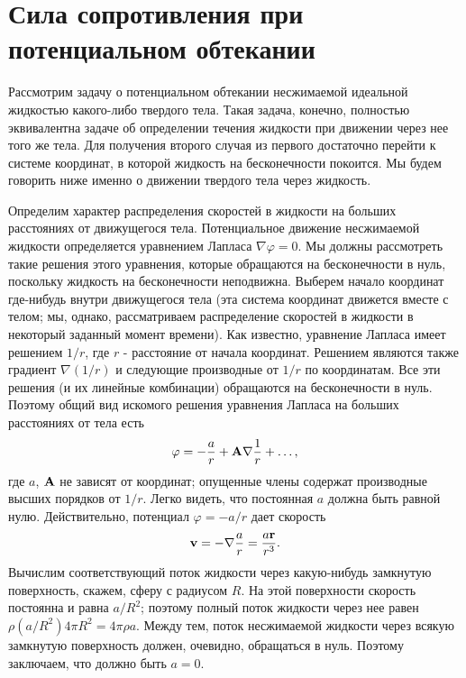 \section{Сила сопротивления при потенциальном обтекании}
\label{sec:p11}

Рассмотрим задачу о потенциальном обтекании несжимаемой идеальной жидкостью
какого-либо твердого тела. Такая задача, конечно, полностью эквивалентна задаче
об определении течения жидкости при движении через нее того же тела. Для
получения второго случая из первого достаточно перейти к системе координат, в
которой жидкость на бесконечности покоится. Мы будем говорить ниже именно о
движении твердого тела через жидкость.

Определим характер распределения скоростей в жидкости на больших расстояниях от
движущегося тела. Потенциальное движение несжимаемой жидкости определяется
уравнением Лапласа $\nabla \varphi = 0$. Мы должны рассмотреть такие решения
этого уравнения, которые обращаются на бесконечности в нуль, поскольку жидкость
на бесконечности неподвижна. Выберем начало координат где-нибудь внутри
движущегося тела (эта система координат движется вместе с телом; мы, однако,
рассматриваем распределение скоростей в жидкости в некоторый заданный момент
времени). Как известно, уравнение Лапласа имеет решением $1/r$, где $r$ -
расстояние от начала координат. Решением являются также градиент $\nabla(1/r)$ и
следующие производные от $1/r$ по координатам. Все эти решения (и их линейные
комбинации) обращаются на бесконечности в нуль. Поэтому общий вид искомого
решения уравнения Лапласа на больших расстояниях от тела есть
\[
   \varphi = - \frac{a}{r} + \mathbf{A} \nabla \frac1{r} + \dots ,
\]
где $a$, $\mathbf{A}$ не зависят от координат; опущенные члены содержат
производные высших порядков от $1/r$. Легко видеть, что постоянная $a$ должна
быть равной нулю. Действительно, потенциал $\varphi = -a/r$ дает скорость
\[
   \mathbf{v} = - \nabla \frac{a}{r} = \frac{a \mathbf{r}}{r^3}.
\]
Вычислим соответствующий поток жидкости через какую-нибудь замкнутую
поверхность, скажем, сферу с радиусом $R$. На этой поверхности скорость
постоянна и равна $a/R^2$; поэтому полный поток жидкости через нее равен
$\rho(a/R^2)4\pi R^2 = 4\pi \rho a$. Между тем, поток несжимаемой жидкости
через всякую замкнутую поверхность должен, очевидно, обращаться в нуль. Поэтому
заключаем, что должно быть $a = 0$.

